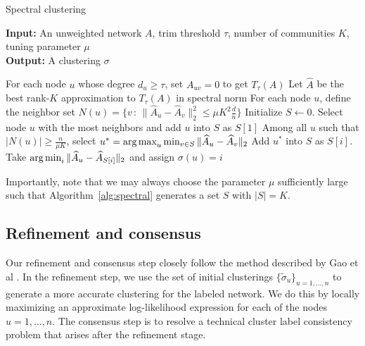 \documentclass{article}
\begin{document}
\begin{algorithm}[h!]
\caption{Spectral clustering}
\label{alg:spectral}
\textbf{Input:} An unweighted network $A$, trim threshold $\tau$, number of communities $K$, tuning parameter $\mu$ \\
\textbf{Output:} A clustering $\sigma$ \\

\begin{algorithmic}[1]
\State For each node $u$ whose degree $d_u \geq \tau$, set $A_{uv} = 0$ to get $T_{\tau}(A)$
\State Let $\hat{A}$ be the best rank-$K$ approximation to $T_{\tau}(A)$ in spectral norm
\State For each node $u$, define the neighbor set $N(u) = \{ v \,:\, \| \hat{A}_u - \hat{A}_v \|_2^2 \leq \mu K^2 \frac{\bar{d}}{n} \}$
\State Initialize $S \leftarrow 0$. Select node $u$ with the most neighbors and add $u$ into $S$ as $S[1]$
    \State Among all $u$ such that $|N(u)| \geq \frac{n}{\mu K}$, select 
           $u^* = \mathop{\text{\rm arg\,max}}_u \min_{v \in S} \| \widehat{A}_u - \widehat{A}_v \|_2$
    \State Add $u^*$ into $S$ as $S[i]$.
\EndFor
{}
    \State Take $\mathop{\text{\rm arg\,min}}_i \| \widehat{A}_u - \widehat{A}_{S[i]} \|_2$ and assign $\sigma(u) = i$
\EndFor
\end{algorithmic}
\end{algorithm}

Importantly, note that we may always choose the parameter $\mu$ sufficiently large such that Algorithm~\ref{alg:spectral} generates a set $S$ with $|S| = K$.

\subsection{Refinement and consensus}

Our refinement and consensus step closely follow the method described by Gao et al \cite{gao2015achieving}. In the refinement step, we use the set of initial clusterings $\{\tilde{\sigma}_u\}_{u=1, \dots, n}$ to generate a more accurate clustering for the labeled network. We do this by locally maximizing an approximate log-likelihood expression for each of the nodes $u=1, \dots, n$. The consensus step is to resolve a technical cluster label consistency problem that arises after the refinement stage. 
\end{document}
